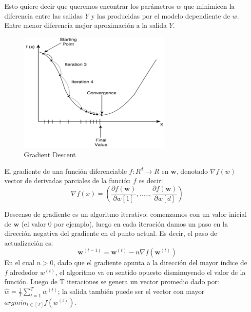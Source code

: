 Esto quiere decir que queremos encontrar los parámetros $w$ que minimicen la diferencia entre las salidas $Y$ y las producidas por el modelo dependiente de $w$. Entre menor  diferencia mejor aproximación a la salida $Y$. 

\begin{figure}[H] \centering
  \includegraphics[height=6cm,keepaspectratio=true,clip=true]{imagenes/MarcoTeorico/gradient-descent.png}
  \caption{Gradient Descent }\label{Fig:gradient-descent}
\end{figure}


El gradiente de una función diferenciable $ f: R^d \longrightarrow R $ en $\textbf{w}$, denotado $ \nabla f(w) $ vector de derivadas parciales de la función $f$ es decir:
\begin{equation}
\nabla f(x) = (\frac{\partial f(\textbf{w})}{\partial w[1]},....., \frac{\partial f(\textbf{w})}{\partial w[d]})
\end{equation}

Descenso de gradiente es un algoritmo iterativo; comenzamos con un valor inicial de $\textbf{w}$ (el valor 0 por ejemplo), luego en cada iteración damos un paso en la dirección negativa del gradiente en el punto actual. Es decir, el paso de actualización es:
\begin{equation}
\textbf{w}^{(t-1)} = \textbf{w}^{(t)} - n \nabla f(\textbf{w}^{(t)})
\end{equation}
En el cual $n > 0$, dado que el gradiente apunta a la dirección del mayor índice de $f$ alrededor $w^{(t)}$, el algoritmo va en sentido opuesto disminuyendo el valor de la función. Luego de T iteraciones se genera un vector promedio dado por: $ \hat{w} = \frac{1}{T} \sum_{t=1}^T w^{(t)}$; la salida también puede ser el vector con mayor  $ argmin_{t \in [T]} f(w^{(t)}) $.


